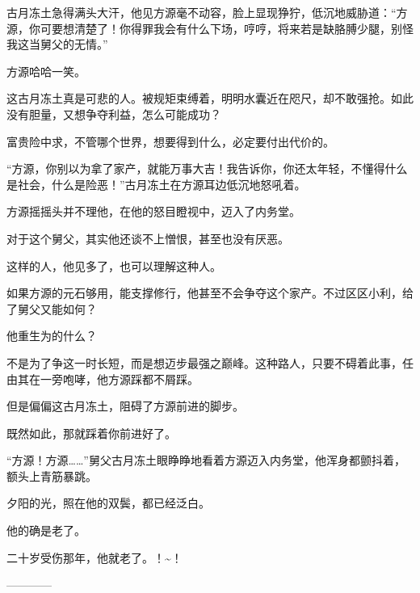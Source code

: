 \begin{this_body}
古月冻土急得满头大汗，他见方源毫不动容，脸上显现狰狞，低沉地威胁道：“方源，你可要想清楚了！你得罪我会有什么下场，哼哼，将来若是缺胳膊少腿，别怪我这当舅父的无情。”

方源哈哈一笑。

这古月冻土真是可悲的人。被规矩束缚着，明明水囊近在咫尺，却不敢强抢。如此没有胆量，又想争夺利益，怎么可能成功？

富贵险中求，不管哪个世界，想要得到什么，必定要付出代价的。

“方源，你别以为拿了家产，就能万事大吉！我告诉你，你还太年轻，不懂得什么是社会，什么是险恶！”古月冻土在方源耳边低沉地怒吼着。

方源摇摇头并不理他，在他的怒目瞪视中，迈入了内务堂。

对于这个舅父，其实他还谈不上憎恨，甚至也没有厌恶。

这样的人，他见多了，也可以理解这种人。

如果方源的元石够用，能支撑修行，他甚至不会争夺这个家产。不过区区小利，给了舅父又能如何？

他重生为的什么？

不是为了争这一时长短，而是想迈步最强之巅峰。这种路人，只要不碍着此事，任由其在一旁咆哮，他方源踩都不屑踩。

但是偏偏这古月冻土，阻碍了方源前进的脚步。

既然如此，那就踩着你前进好了。

“方源！方源……”舅父古月冻土眼睁睁地看着方源迈入内务堂，他浑身都颤抖着，额头上青筋暴跳。

夕阳的光，照在他的双鬓，都已经泛白。

他的确是老了。

二十岁受伤那年，他就老了。！\~{}！

------------

\end{this_body}


